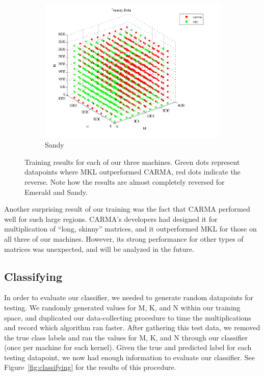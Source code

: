 \begin{figure}[t]
        \begin{subfigure}[t]{0.33\textwidth}
            \includegraphics[width=\textwidth]{figures/sandy_train.png}
            \caption{Sandy}
            \label{f:train_sandy}
        \end{subfigure}
        \caption{Training results for each of our three machines. Green dots represent datapoints where MKL outperformed CARMA, red dots indicate the reverse. Note how the results are almost completely reversed for Emerald and Sandy.}
    \label{fig:training}
\end{figure}

Another surprising result of our training was the fact that CARMA performed well for such large regions.
CARMA's developers had designed it for multiplication of ``long, skinny'' matrices, and it outperformed MKL for those on all three of our machines.
However, its strong performance for other types of matrices was unexpected, and will be analyzed in the future.

\subsection{Classifying}
In order to evaluate our classifier, we needed to generate random datapoints for testing.
We randomly generated values for M, K, and N within our training space, and duplicated our data-collecting procedure to time the multiplications and record which algorithm ran faster.
After gathering this test data, we removed the true class labels and ran the values for M, K, and N through our classifier (once per machine for each kernel).
Given the true and predicted label for each testing datapoint, we now had enough information to evaluate our classifier.
See Figure~\ref{fig:classifying} for the results of this procedure.

